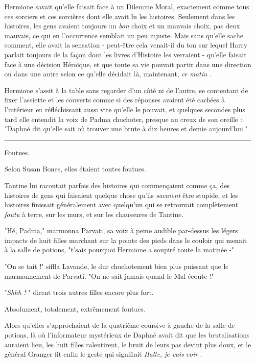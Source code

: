 Hermione savait qu'elle faisait face à un Dilemme Moral, exactement comme tous ces sorciers et ces sorcières dont elle avait lu les histoires. Seulement dans les histoires, les gens avaient toujours un \emph{bon}  choix et un mauvais choix, pas deux mauvais, ce qui en l'occurrence semblait un peu injuste. Mais sans qu'elle sache comment, elle avait la sensation - peut-être cela venait-il du ton sur lequel Harry parlait toujours de la façon dont les livres d'Histoire les verraient - qu'elle faisait face à une décision Héroïque, et que toute sa vie pouvait partir dans une direction ou dans une autre selon ce qu'elle décidait là, maintenant, \emph{ce matin} .

Hermione s'assit à la table sans regarder d'un côté ni de l'autre, se contentant de fixer l'assiette et les couverts comme si des réponses avaient été cachées à l'intérieur en réfléchissant aussi vite qu'elle le pouvait, et quelques secondes plus tard elle entendit la voix de Padma chuchoter, presque au creux de son oreille : "Daphné dit qu'elle sait où trouver une brute à dix heures et demie aujourd'hui."
\par\noindent\rule{\textwidth}{0.4pt}
Foutues.

Selon Susan Bones, elles étaient toutes foutues.

Tantine lui racontait parfois des histoires qui commençaient comme ça, des histoires de gens qui faisaient quelque chose qu'ils \emph{savaient}  être stupide, et les histoires finissait généralement avec quelqu'un qui se retrouvait complètement \emph{foutu}  à terre, sur les murs, et sur les chaussures de Tantine.

"Hé, Padma," marmonna Parvati, sa voix à peine audible par-dessus les légers impacts de huit filles marchant sur la pointe des pieds dans le couloir qui menait à la salle de potions, "t'sais pourquoi Hermione a soupiré toute la matinée -"

"On se tait !" siffla Lavande, le dur chuchotement bien plus puissant que le marmonnement de Parvati. "On ne sait jamais quand le Mal écoute !"

"\emph{Shhh !} " dirent trois autres filles encore plus fort.

Absolument, totalement, extrêmement foutues.

Alors qu'elles s'approchaient de la quatrième coursive à gauche de la salle de potions, là où l'informateur mystérieux de Daphné avait dit que les brutalisations auraient lieu, les huit filles ralentirent, le bruit de leurs pas devint plus doux, et le général Granger fit enfin le geste qui signifiait \emph{Halte, je vais voir} .


